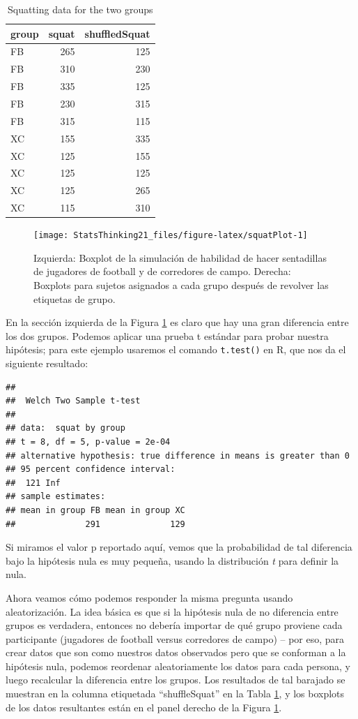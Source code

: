 \documentclass[
  12pt,
]{book}
\begin{document}
\begin{table}

\caption{\label{tab:squatPlot}Squatting data for the two groups}
\centering
\begin{tabular}[t]{l|r|r}
\hline
group & squat & shuffledSquat\\
\hline
FB & 265 & 125\\
\hline
FB & 310 & 230\\
\hline
FB & 335 & 125\\
\hline
FB & 230 & 315\\
\hline
FB & 315 & 115\\
\hline
XC & 155 & 335\\
\hline
XC & 125 & 155\\
\hline
XC & 125 & 125\\
\hline
XC & 125 & 265\\
\hline
XC & 115 & 310\\
\hline
\end{tabular}
\end{table}

\begin{figure}
\texttt{[image: StatsThinking21\_files/figure-latex/squatPlot-1]} \caption{Izquierda: Boxplot de la simulación de habilidad de hacer sentadillas de jugadores de football y de corredores de campo. Derecha: Boxplots para sujetos asignados a cada grupo después de revolver las etiquetas de grupo.}\label{fig:squatPlot}
\end{figure}

En la sección izquierda de la Figura \ref{fig:squatPlot} es claro que hay una gran diferencia entre los dos grupos. Podemos aplicar una prueba t estándar para probar nuestra hipótesis; para este ejemplo usaremos el comando \texttt{t.test()} en R, que nos da el siguiente resultado:

\begin{verbatim}
## 
##  Welch Two Sample t-test
## 
## data:  squat by group
## t = 8, df = 5, p-value = 2e-04
## alternative hypothesis: true difference in means is greater than 0
## 95 percent confidence interval:
##  121 Inf
## sample estimates:
## mean in group FB mean in group XC 
##              291              129
\end{verbatim}

Si miramos el valor p reportado aquí, vemos que la probabilidad de tal diferencia bajo la hipótesis nula es muy pequeña, usando la distribución \emph{t} para definir la nula.

Ahora veamos cómo podemos responder la misma pregunta usando aleatorización. La idea básica es que si la hipótesis nula de no diferencia entre grupos es verdadera, entonces no debería importar de qué grupo proviene cada participante (jugadores de football versus corredores de campo) -- por eso, para crear datos que son como nuestros datos observados pero que se conforman a la hipótesis nula, podemos reordenar aleatoriamente los datos para cada persona, y luego recalcular la diferencia entre los grupos. Los resultados de tal barajado se muestran en la columna etiquetada ``shuffleSquat'' en la Tabla \ref{tab:squatPlot}, y los boxplots de los datos resultantes están en el panel derecho de la Figura \ref{fig:squatPlot}.
\end{document}
